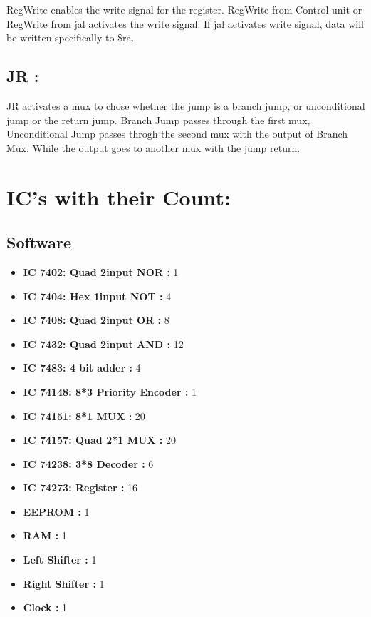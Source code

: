 \documentclass[12pt]{article}
\begin{document}
RegWrite enables the write signal for the register. RegWrite from Control unit or RegWrite from jal activates the write signal. If jal activates write signal, data will be written specifically to \$ra. 
\subsection{JR : }
JR activates a mux to chose whether the jump is a branch jump, or unconditional jump or the return jump. Branch Jump passes through the first mux, Unconditional Jump passes throgh the second mux with the output of Branch Mux. While the output goes to another mux with the jump return.

\section{IC's with their Count: }

\subsection{Software}

\begin{itemize}
    \item \textbf{IC 7402: Quad 2input NOR : } 1
    \item \textbf{IC 7404: Hex 1input NOT : } 4
    \item \textbf{IC 7408: Quad 2input OR : } 8
    \item \textbf{IC 7432: Quad 2input AND : } 12
    \item \textbf{IC 7483: 4 bit adder : } 4
    \item \textbf{IC 74148: 8*3 Priority Encoder : } 1
    \item \textbf{IC 74151: 8*1 MUX : } 20
    \item \textbf{IC 74157: Quad 2*1 MUX : } 20
    \item \textbf{IC 74238: 3*8 Decoder : } 6
    \item \textbf{IC 74273: Register : } 16
    \item \textbf{EEPROM : } 1
    \item \textbf{RAM : } 1
    \item \textbf{Left Shifter : } 1
    \item \textbf{Right Shifter : } 1
    \item \textbf{Clock : } 1
    
\end{itemize}
\end{document}
